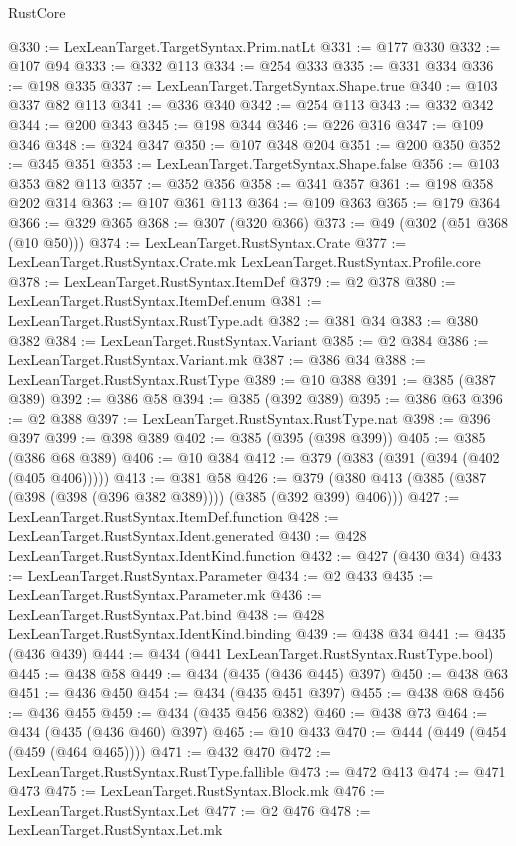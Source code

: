 \begin{lexlean}{RustCore}
\begin{coremodule}
@330 := LexLeanTarget.TargetSyntax.Prim.natLt
@331 := @177 @330
@332 := @107 @94
@333 := @332 @113
@334 := @254 @333
@335 := @331 @334
@336 := @198 @335
@337 := LexLeanTarget.TargetSyntax.Shape.true
@340 := @103 @337 @82 @113
@341 := @336 @340
@342 := @254 @113
@343 := @332 @342
@344 := @200 @343
@345 := @198 @344
@346 := @226 @316
@347 := @109 @346
@348 := @324 @347
@350 := @107 @348 @204
@351 := @200 @350
@352 := @345 @351
@353 := LexLeanTarget.TargetSyntax.Shape.false
@356 := @103 @353 @82 @113
@357 := @352 @356
@358 := @341 @357
@361 := @198 @358 @202 @314
@363 := @107 @361 @113
@364 := @109 @363
@365 := @179 @364
@366 := @329 @365
@368 := @307 (@320 @366)
@373 := @49 (@302 (@51 @368 (@10 @50)))
@374 := LexLeanTarget.RustSyntax.Crate
@377 := LexLeanTarget.RustSyntax.Crate.mk LexLeanTarget.RustSyntax.Profile.core
@378 := LexLeanTarget.RustSyntax.ItemDef
@379 := @2 @378
@380 := LexLeanTarget.RustSyntax.ItemDef.enum
@381 := LexLeanTarget.RustSyntax.RustType.adt
@382 := @381 @34
@383 := @380 @382
@384 := LexLeanTarget.RustSyntax.Variant
@385 := @2 @384
@386 := LexLeanTarget.RustSyntax.Variant.mk
@387 := @386 @34
@388 := LexLeanTarget.RustSyntax.RustType
@389 := @10 @388
@391 := @385 (@387 @389)
@392 := @386 @58
@394 := @385 (@392 @389)
@395 := @386 @63
@396 := @2 @388
@397 := LexLeanTarget.RustSyntax.RustType.nat
@398 := @396 @397
@399 := @398 @389
@402 := @385 (@395 (@398 @399))
@405 := @385 (@386 @68 @389)
@406 := @10 @384
@412 := @379 (@383 (@391 (@394 (@402 (@405 @406)))))
@413 := @381 @58
@426 := @379 (@380 @413 (@385 (@387 (@398 (@398 (@396 @382 @389)))) (@385 (@392 @399) @406)))
@427 := LexLeanTarget.RustSyntax.ItemDef.function
@428 := LexLeanTarget.RustSyntax.Ident.generated
@430 := @428 LexLeanTarget.RustSyntax.IdentKind.function
@432 := @427 (@430 @34)
@433 := LexLeanTarget.RustSyntax.Parameter
@434 := @2 @433
@435 := LexLeanTarget.RustSyntax.Parameter.mk
@436 := LexLeanTarget.RustSyntax.Pat.bind
@438 := @428 LexLeanTarget.RustSyntax.IdentKind.binding
@439 := @438 @34
@441 := @435 (@436 @439)
@444 := @434 (@441 LexLeanTarget.RustSyntax.RustType.bool)
@445 := @438 @58
@449 := @434 (@435 (@436 @445) @397)
@450 := @438 @63
@451 := @436 @450
@454 := @434 (@435 @451 @397)
@455 := @438 @68
@456 := @436 @455
@459 := @434 (@435 @456 @382)
@460 := @438 @73
@464 := @434 (@435 (@436 @460) @397)
@465 := @10 @433
@470 := @444 (@449 (@454 (@459 (@464 @465))))
@471 := @432 @470
@472 := LexLeanTarget.RustSyntax.RustType.fallible
@473 := @472 @413
@474 := @471 @473
@475 := LexLeanTarget.RustSyntax.Block.mk
@476 := LexLeanTarget.RustSyntax.Let
@477 := @2 @476
@478 := LexLeanTarget.RustSyntax.Let.mk

\end{coremodule}
\end{lexlean}
